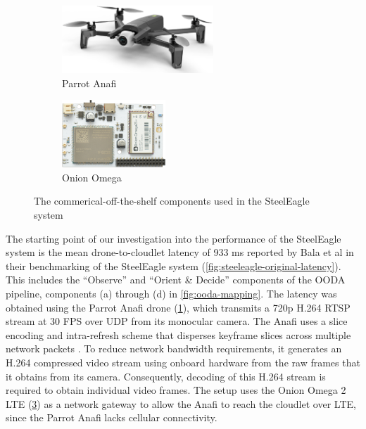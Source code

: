 \begin{figure}[b]
    \centering
    \begin{subfigure}[t]{0.45\textwidth}
        \centering
        \includegraphics[height=1in]{figs/parrot-anafi.pdf}
        \caption{Parrot Anafi}
        \label{fig:parrot-anafi}
    \end{subfigure}
    \begin{subfigure}[t]{0.45\textwidth}
        \centering
        \includegraphics[height=1in]{figs/onion-omega.png}
        \caption{Onion Omega}
        \label{fig:onion-omega}
    \end{subfigure}
    \caption{The commerical-off-the-shelf components used in the SteelEagle system}
\end{figure}

The starting point of our investigation into the performance of the SteelEagle
system is the mean drone-to-cloudlet latency of 933 ms reported by Bala et al
in their benchmarking of the SteelEagle system
(\cref{fig:steeleagle-original-latency}). This includes the ``Observe'' and
``Orient \& Decide'' components of the OODA pipeline, components (a) through
(d) in \cref{fig:ooda-mapping}.  The latency was obtained using the Parrot
Anafi drone (\cref{fig:parrot-anafi}), which transmits a 720p H.264 RTSP stream
at 30 FPS over UDP from its monocular camera.  The Anafi uses a slice encoding
and intra-refresh scheme that disperses keyframe slices across multiple network
packets \cite{anafi_white_paper}. To reduce network bandwidth requirements, it
generates an H.264 compressed video stream using onboard hardware from the raw
frames that it obtains from its camera. Consequently, decoding of this H.264
stream is required to obtain individual video frames.  The setup uses the Onion
Omega 2 LTE (\cref{fig:onion-omega}) as a network gateway to allow the Anafi to
reach the cloudlet over LTE, since the Parrot Anafi lacks cellular
connectivity.

